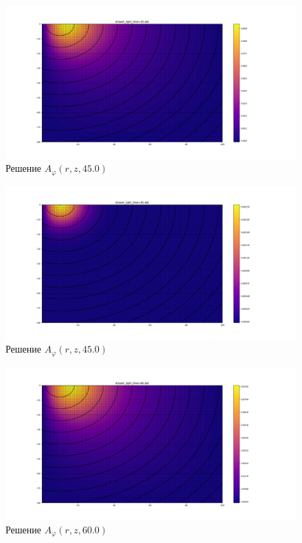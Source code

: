\begin{figure}
	\centering
	\includegraphics[width=1.0\linewidth]{images/Answer_Aphi_time=45.png}
	\caption{Решение $A_{\varphi}(r, z, 45.0)$}
	\label{fig:A_phi_45}
\end{figure}

\begin{figure}
	\centering
	\includegraphics[width=1.0\linewidth]{images/Answer_Ephi_time=45.png}
	\caption{Решение $A_{\varphi}(r, z, 45.0)$}
	\label{fig:E_phi_45}
\end{figure} 


\begin{figure}
	\centering
	\includegraphics[width=1.0\linewidth]{images/Answer_Aphi_time=60.png}
	\caption{Решение $A_{\varphi}(r, z, 60.0)$}
	\label{fig:A_phi_60}
\end{figure}

